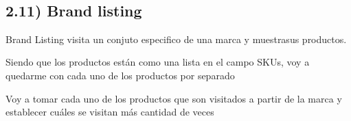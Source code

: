 \documentclass[11pt]{article}
\begin{document}
    \begin{center}
    \end{center}
    { \hspace*{\fill} \\}
    
    \subsection{2.11) Brand listing}\label{brand-listing}

    Brand Listing visita un conjuto especifico de una marca y muestrasus
productos.

Siendo que los productos están como una lista en el campo SKUs, voy a
quedarme con cada uno de los productos por separado

Voy a tomar cada uno de los productos que son visitados a partir de la
marca y establecer cuáles se visitan más cantidad de veces
\end{document}
